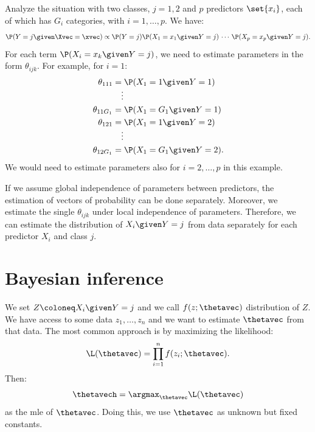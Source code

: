 \begin{example}
    Analyze the situation with two classes, $j = 1,2$ and $p$ predictors $\set{x_i}$, each of which has $G_i$ categories, with $i = 1, \ldots, p$. We have:
    \begin{equation}
        \P(Y = j \given \Xvec = \xvec) \propto \P(Y = j) \P(X_1 = x_1 \given Y = j)\,\cdots\,\P(X_p = x_p \given Y = j).
    \end{equation}
    For each term $\P(X_i = x_k \given Y = j)$, we need to estimate parameters in the form $\theta_{ijk}$. For example, for $i = 1$:
    \begin{equation}
        \begin{aligned}
            \theta_{111}   & = \P(X_1 = 1 \given Y = 1)    \\[-5pt]
                           & \quad\vdots                   \\
            \theta_{11G_1} & = \P(X_1 = G_1 \given Y = 1)  \\
            \theta_{121}   & = \P(X_1 = 1 \given Y = 2)    \\[-5pt]
                           & \quad\vdots                   \\
            \theta_{12G_1} & = \P(X_1 = G_1 \given Y = 2).
        \end{aligned}
    \end{equation}
    We would need to estimate parameters also for $i = 2, \ldots, p$ in this example.
\end{example}

If we assume global independence of parameters between predictors, the estimation of vectors of probability can be done separately. Moreover, we estimate the single $\theta_{ijk}$ under local independence of parameters. Therefore, we can estimate the distribution of $X_i\given Y = j$ from data separately for each predictor $X_i$ and class $j$.

\section{Bayesian inference}
We set $Z \coloneq X_i \given Y = j$ and we call $f(z; \thetavec)$ distribution of $Z$. We have access to some data $z_1, \ldots, z_n$ and we want to estimate $\thetavec$ from that data. The most common approach is by maximizing the likelihood:
\begin{equation}
    \L(\thetavec) = \prod_{i = 1}^n f(z_i; \thetavec).
\end{equation}
Then:
\begin{equation}
    \thetavech = \argmax_{\thetavec} \L(\thetavec)
\end{equation}
as the \acs{mle} of $\thetavec$. Doing this, we use $\thetavec$ as unknown but fixed constants.

